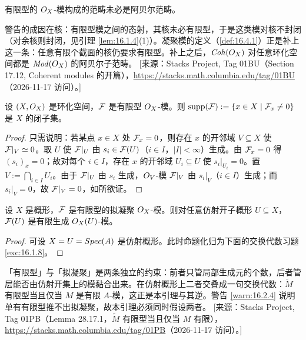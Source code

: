 \begin{warning}\label{warn:16.1.5}
有限型的 $O_X$-模构成的范畴未必是阿贝尔范畴。
\end{warning}

\begin{yizhu}
警告的成因在核：有限型模之间的态射，其核未必有限型，于是这类模对核不封闭（对余核则封闭，见引理 \ref{lem:16.1.4}(1)）。凝聚模的定义（\ref{def:16.4.1}）正是补上这一条：任意有限个截面的核仍要求有限型。补上之后，$\mathit{Coh}(O_X)$ 对任意环化空间都是 $\mathit{Mod}(O_X)$ 的阿贝尔子范畴。
[来源：Stacks Project, Tag 01BU（Section 17.12, Coherent modules 的开篇），\url{https://stacks.math.columbia.edu/tag/01BU}（2026-11-17 访问）。]
\end{yizhu}

\begin{lemma}\label{lem:16.1.6}
设 $(X,O_X)$ 是环化空间，$\mathcal{F}$ 是有限型 $O_X$-模。则 $\mathrm{supp}(\mathcal{F}):=\{x\in X\mid \mathcal{F}_x\neq 0\}$ 是 $X$ 的闭子集。
\end{lemma}

\begin{proof}
只需说明：若某点 $x\in X$ 处 $\mathcal{F}_x=0$，则存在 $x$ 的开邻域 $V\subseteq X$ 使 $\mathcal{F}|_V\simeq 0$。取 $U$ 使 $\mathcal{F}|_U$ 由 $s_i\in\mathcal{F}(U)$（$i\in I$，$|I|<\infty$）生成。由 $\mathcal{F}_x=0$ 得 $(s_i)_x=0$；故对每个 $i\in I$，存在 $x$ 的开邻域 $U_i\subseteq U$ 使 $s_i|_{U_i}=0$。置 $V:=\bigcap_{i\in I}U_i$。由于 $\mathcal{F}|_U$ 由 $s_i$ 生成，$O_V$-模 $\mathcal{F}|_V$ 由 $s_i|_V$（$i\in I$）生成；而 $s_i|_V=0$，故 $\mathcal{F}|_V=0$，如所欲证。
\end{proof}

\begin{lemma}\label{lem:16.1.7}
设 $X$ 是概形，$\mathcal{F}$ 是有限型的拟凝聚 $O_X$-模。则对任意仿射开子概形 $U\subseteq X$，$\mathcal{F}(U)$ 是有限生成 $O_X(U)$-模。
\end{lemma}

\begin{proof}
可设 $X=U=Spec(A)$ 是仿射概形。此时命题化归为下面的交换代数习题 \ref{exc:16.1.8}。
\end{proof}

\begin{yizhu}
「有限型」与「拟凝聚」是两条独立的约束：前者只管局部生成元的个数，后者管层能否由仿射开集上的模黏合出来。在仿射概形上二者交叠成一句交换代数：$\widetilde{M}$ 有限型当且仅当 $M$ 是有限 $A$-模，这正是本引理与其逆。警告 \ref{warn:16.2.4} 说明单有有限型推不出拟凝聚，故本引理必须同时假设两者。
[来源：Stacks Project, Tag 01PB（Lemma 28.17.1，$\widetilde{M}$ 有限型当且仅当 $M$ 有限），\url{https://stacks.math.columbia.edu/tag/01PB}（2026-11-17 访问）。]
\end{yizhu}

